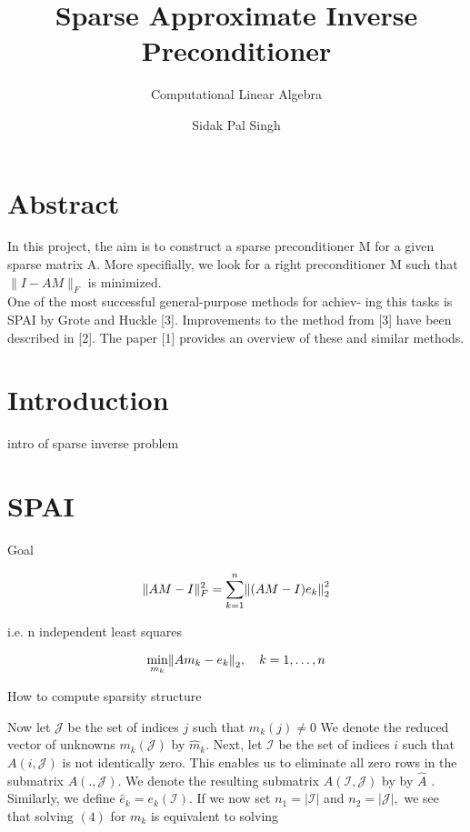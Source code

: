 \documentclass[paper=A4, fontsize=11pt]{scrartcl}
\title{Sparse Approximate Inverse Preconditioner}
\subtitle{Computational Linear Algebra}
\author{Sidak Pal Singh}
\let\originalleft\left
\let\originalright\right
\renewcommand{\left}{\mathopen{}\mathclose\bgroup\originalleft}
\renewcommand{\right}{\aftergroup\egroup\originalright}
\begin{document}
	\maketitle
	
	\section{Abstract}
	
	In this project, the aim is to construct a sparse preconditioner M for a given sparse matrix A. More specifially, we look for a right preconditioner M such that $\|I-A M\|_{F}$ is minimized. \\
	One of the most successful general-purpose methods for achiev- ing this tasks is SPAI by Grote and Huckle [3]. Improvements to the method from [3] have been described in [2]. The paper [1] provides an overview of these and similar methods.
	
	
	\section{Introduction}
	
	intro of sparse inverse problem
	
	\newpage
	
	\section{SPAI}
	
	Goal
	
	\begin{equation}
	\|A M-I\|_{F}^{2}=\sum_{k=1}^{n}\left\|(A M-I) e_{k}\right\|_{2}^{2}
	\end{equation}
	
	i.e. n independent least squares
	
	
	\begin{equation}
	\min _{m_{k}}\left\|A m_{k}-e_{k}\right\|_{2}, \quad k=1, \ldots, n
	\end{equation}
	
	
	How to compute sparsity structure 
	
	Now let \(\mathcal{J}\) be the set of indices \(j\) such that \(m_{k}(j) \neq 0\) We denote the reduced vector of unknowns \(m_{k}(\mathcal{J})\) by \(\hat{m}_{k} .\) Next, let \(\mathcal{I}\) be the set of
	indices \(i\) such that \(A(i, \mathcal{J})\) is not identically zero. This enables us to eliminate all zero rows in the submatrix \(A( ., \mathcal{J}) .\) We denote the resulting submatrix \(A(\mathcal{I}, \mathcal{J})\) by by
	\(\hat{A}\) . Similarly, we define \(\hat{e}_{k}=e_{k}(\mathcal{I}) .\) If we now set \(n_{1}=|\mathcal{I}|\) and \(n_{2}=|\mathcal{J}|,\) we see that
	solving \((4)\) for \(m_{k}\) is equivalent to solving
	
\end{document}

